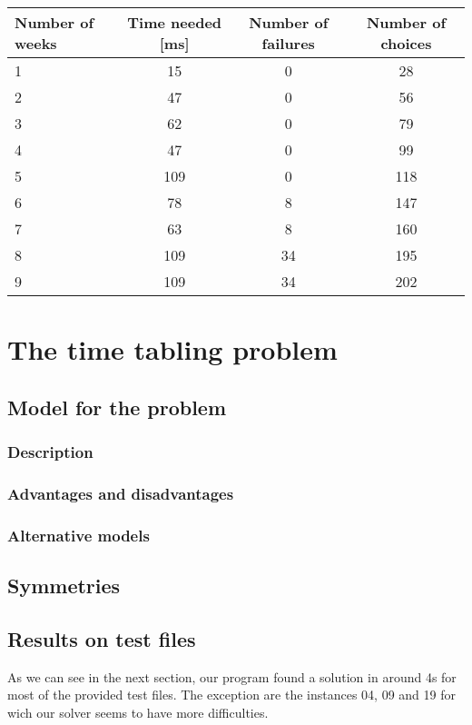 \documentclass{eplDoc}
\begin{document}
\begin{center}
		\begin{tabular}{|l|c|c|c|}
			\hline
			Number of weeks & Time needed [ms] & Number of failures & Number of choices \\ 
			\hline
			1 & 15 & 0 & 28 \\ 
			2 & 47 & 0 & 56 \\ 
			3 & 62 & 0 & 79 \\ 
			4 & 47 & 0 & 99 \\ 
			5 & 109 & 0 & 118 \\ 
			6 & 78 & 8 & 147 \\ 
			7 & 63 & 8 & 160 \\ 
			8 & 109 & 34 & 195 \\ 
			9 & 109 & 34 & 202 \\ 
			\hline
		\end{tabular}
\end{center}



\section{The time tabling problem} 

\subsection{Model for the problem}
\subsubsection{Description}
\subsubsection{Advantages and disadvantages}
\subsubsection{Alternative models}

\subsection{Symmetries}

\subsection{Results on test files}

As we can see in the next section, our program found a solution in around 4s for most of the provided test files. The exception are the instances 04, 09 and 19 for wich our solver seems to have more difficulties. \\ 
\end{document}
